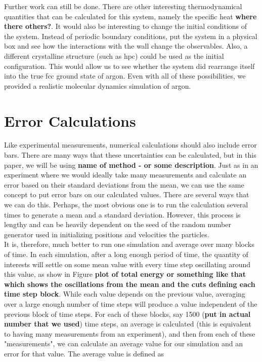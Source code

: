 \documentclass{article}
\begin{document}
\begin{multicols}{2}
Further work can still be done.  There are other interesting thermodynamical quantities that can be calculated for this system, namely the specific heat \textbf{where there others?}.  It would also be interesting to change the initial conditions of the system.  Instead of periodic boundary conditions, put the system in a physical box and see how the interactions with the wall change the observables.  Also, a different crystalline structure (such as hpc) could be used as the initial configuration.  This would allow us to see whether the system did rearrange itself into the true fcc ground state of argon.  Even with all of these possibilities, we provided a realistic molecular dynamics simulation of argon.  

\appendix 

\section{Error Calculations}

Like experimental measurements, numerical calculations should also include error bars.  There are many ways that these uncertainties can be calculated, but in this paper, we will be using \textbf{name of method - or some description}.  Just as in an experiment where we would ideally take many measurements and calculate an error based on their standard deviations from the mean, we can use the same concept to put error bars on our calculated values.  There are several ways that we can do this.  Perhaps, the most obvious one is to run the calculation several times to generate a mean and a standard deviation.  However, this process is lengthy and can be heavily dependent on the seed of the random number generator used in initializing positions and velocities the particles.  \\

It is, therefore, much better to run one simulation and average over many blocks of time.  In each simulation, after a long enough period of time, the quantity of interests will settle on some mean value with every time step oscillating around this value, as show in Figure \textbf{plot of total energy or something like that which shows the oscillations from the mean and the cuts defining each time step block}.  While each value depends on the previous value, averaging over a large enough number of time steps will produce a value independent of the previous block of time steps.  For each of these blocks, say 1500 (\textbf{put in actual number that we used}) time steps, an average is calculated (this is equivalent to having many measurements from an experiment), and then from each of these "measurements", we can calculate an average value for our simulation and an error for that value.  The average value is defined as 


\end{multicols}
\end{document}
